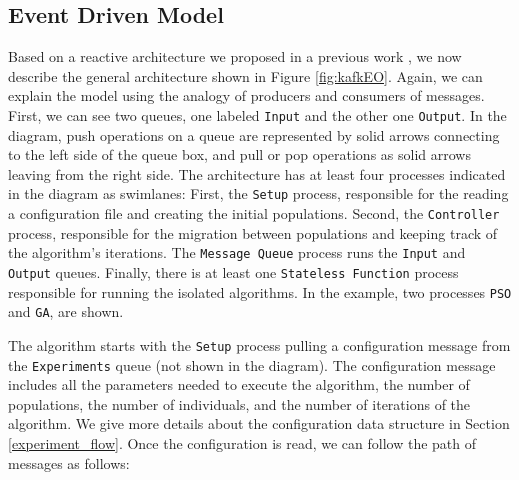 \documentclass[review]{elsarticle}
\begin{document}
\subsection{Event Driven Model} 
\label{edm}
Based on a reactive architecture we proposed in a previous work
\cite{guervos2018introducing}, we now describe the general architecture shown in
Figure \ref{fig:kafkEO}. Again, we can explain the model using the analogy
of producers and consumers of messages. First, we can see two queues, 
one labeled \texttt{Input} and the other one \texttt{Output}. In the diagram, 
push operations on a queue are represented by solid arrows connecting to the left side
of the queue box, and pull or pop operations as solid arrows leaving from the right side.
The architecture has at least four processes indicated in the diagram as
swimlanes: First, the \texttt{Setup} process, responsible for the reading a configuration
file and creating the initial populations. Second, the \texttt{Controller} process,
responsible for the migration between populations and keeping track of the algorithm's
iterations. The \texttt{Message Queue} process runs the \texttt{Input} and \texttt{Output}
queues. Finally, there is at least one \texttt{Stateless Function} process responsible
for running the isolated algorithms. In the example, two processes \texttt{PSO} and \texttt{GA},
are shown. 

The algorithm starts with the \texttt{Setup} process pulling a configuration message from
the \texttt{Experiments} queue (not shown in the diagram). The configuration message 
includes all the parameters needed to execute the algorithm, the number of populations,
the number of individuals, and the number of iterations 
of the algorithm. We give more details about the configuration data structure
in Section \ref{experiment_flow}. %
Once the configuration is read, we can follow the path of 
messages as follows:
\end{document}
